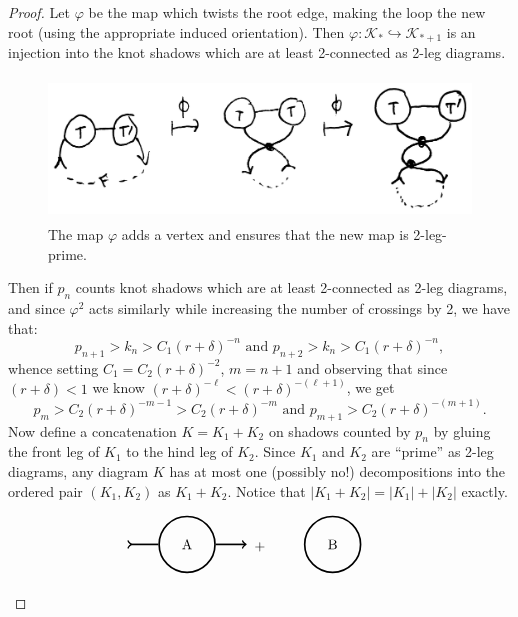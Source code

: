 \documentclass[amsmath,longbibliography,secnumarabic,floatfix,amssymb,nofootinbib,nobibnotes,letterpaper,11pt,notitlepage,preprint]{revtex4-1}
\newcommand{\FlatKnotDia}{\mathscr{K}}
\newcommand{\KnotShad}{\FlatKnotDia}
\begin{document}
\begin{proof}
  Let $\varphi$ be the map which twists the root edge, making the loop the new root (using the
  appropriate induced orientation). Then $\varphi: \KnotShad_* \hookrightarrow \KnotShad_{*+1}$ is
  an injection into the knot shadows which are at least 2-connected as 2-leg diagrams.
  \begin{figure}[h!]  \centering
    \includegraphics[height=1.5in]{rooted_composite_knot}
    \caption{The map $\varphi$ adds a vertex and ensures that the new map is 2-leg-prime.}
    \label{fig:phi_example}
  \end{figure} Then if $p_n$ counts knot shadows which are at least 2-connected as 2-leg diagrams,
  and since $\varphi^2$ acts similarly while increasing the number of crossings by 2, we have that:
  \[ p_{n+1} > k_{n} > C_1(r + \delta)^{-n} \text{ and } p_{n+2} > k_{n} > C_1(r + \delta)^{-n},\]
  whence setting $C_1 = C_2(r + \delta)^{-2}$, $m = n+1$ and observing that since $(r + \delta) < 1$
  we know $(r+\delta)^{-\ell} < (r+\delta)^{-(\ell+1)}$, we get
  \[ p_{m} > C_2(r + \delta)^{-m-1} > C_2(r + \delta)^{-m} \text{ and } p_{m+1} > C_2(r +
  \delta)^{-(m+1)}.\] Now define a concatenation $K = K_1+K_2$ on shadows counted by $p_n$ by gluing
  the front leg of $K_1$ to the hind leg of $K_2$. Since $K_1$ and $K_2$ are ``prime'' as 2-leg
  diagrams, any diagram $K$ has at most one (possibly no!)  decompositions into the ordered pair
  $(K_1, K_2)$ as $K_1 + K_2$. Notice that $|K_1 + K_2| = |K_1| + |K_2|$ exactly.
  \begin{figure}[h!]  \centering
    \[
    \begin{aligned}
      \begin{tikzpicture}[every path/.style={very thick}]
        \node[draw,circle,minimum size=40pt] (A) at (0,0) {A};
        \node (L) at (-1.5,0) {};
        \node (R) at (1.5,0) {};

        \draw[>-] (L.center) -- (A);
        \draw[->] (A) -- (R.center);
      \end{tikzpicture}
    \end{aligned} +
    \begin{aligned}
      \begin{tikzpicture}[every path/.style={very thick}]
        \node[draw,circle,minimum size=40pt] (A) at (0,0) {B};
        \node (L) at (-1.5,0) {};
        \node (R) at (1.5,0) {};


\end{tikzpicture}
\end{aligned}\]
\end{figure}
\end{proof}
\end{document}
